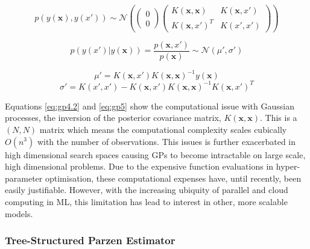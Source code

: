 \documentclass{article}
\begin{document}
			\begin{equation}
			\label{eq:gp4} p(y(\bm{x}),y(x')) \sim \mathcal{N} \left(\begin{pmatrix}
			0\\
			0
			\end{pmatrix}
			\begin{pmatrix} K(\bm{x} , \bm{x}) & K(\bm{x},x')\\
							K(\bm{x},x')^T &  K(x',x')
			\end{pmatrix}\right)\end{equation}



			\begin{equation}\label{eq:gp4.1}p(y(x')|y(\bm{x})) = \frac{p(\bm{x},x')}{p(\bm{x})} \sim  \mathcal{N} (\mu',\sigma') \end{equation}



			\begin{equation}\label{eq:gp4.2}\mu' = K(\bm{x},x')K(\bm{x},\bm{x})^{-1}y(\bm{x})\end{equation}
			\begin{equation} \label{eq:gp5}\sigma' = K(x',x') - K(\bm{x},x')K(\bm{x},\bm{x})^{-1}K(\bm{x},x')^T \end{equation}



			Equations \ref{eq:gp4.2} and \ref{eq:gp5} show the computational issue with Gaussian processes, the inversion of the posterior covariance matrix, \(K(\bm{x},\bm{x})\). This is a \((N,N)\) matrix which means the computational complexity scales cubically \(O(n^3)\) with the number of observations. This issues is further exacerbated in high dimensional search spaces causing GPs to become intractable on large scale, high dimensional problems. Due to the expensive function evaluations in hyper-parameter optimisation, these computational expenses have, until recently, been easily justifiable. However, with the increasing ubiquity of parallel and cloud computing in ML, this limitation has lead to interest in other, more scalable models.


		\subsubsection{Tree-Structured Parzen Estimator}
\end{document}
